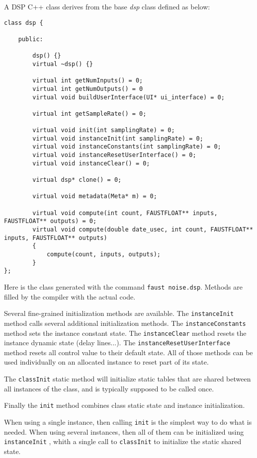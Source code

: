 A \faust DSP C++ class derives from the base \emph{dsp} class defined as below:
\begin{lstlisting}[basicstyle=\ttfamily\footnotesize\color{yotxt}]
class dsp {

    public:

        dsp() {}
        virtual ~dsp() {}

        virtual int getNumInputs() = 0;
        virtual int getNumOutputs() = 0
        virtual void buildUserInterface(UI* ui_interface) = 0;
        
        virtual int getSampleRate() = 0;
        
        virtual void init(int samplingRate) = 0;
        virtual void instanceInit(int samplingRate) = 0;
        virtual void instanceConstants(int samplingRate) = 0;
        virtual void instanceResetUserInterface() = 0;
        virtual void instanceClear() = 0;
    
        virtual dsp* clone() = 0;
    
        virtual void metadata(Meta* m) = 0;
    
        virtual void compute(int count, FAUSTFLOAT** inputs, FAUSTFLOAT** outputs) = 0;
        virtual void compute(double date_usec, int count, FAUSTFLOAT** inputs, FAUSTFLOAT** outputs) 
        { 
            compute(count, inputs, outputs); 
        }     
};
\end{lstlisting} 

Here is the class generated with the command \lstinline'faust noise.dsp'. Methods are filled by the compiler with the actual code. 

Several fine-grained initialization methods are available. The \lstinline'instanceInit' method calls several additional initialization methods. The \lstinline'instanceConstants' method sets the instance constant state. The \lstinline'instanceClear' method resets the instance dynamic state (delay lines...).  The \lstinline'instanceResetUserInterface' method resets all control value to their default state. All of those methods can be used individually on an allocated instance to reset part of its state. 

The \lstinline'classInit' static method will initialize static tables that are shared between all instances of the class, and is typically supposed to be called once. 

Finally the \lstinline'init' method combines class static state and instance initialization.

When using a single instance, then calling  \lstinline'init'  is the simplest way to do what is needed. When using several instances, then all of them can be initialized using  \lstinline'instanceInit' , whith a single call to \lstinline'classInit' to initialize the static shared state.  

